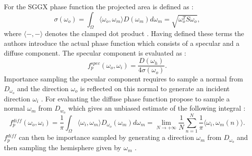 For the SGGX phase function the projected area is defined as \cite[p. 4]{sggx}:
\begin{equation}
    \label{eq:projected_area}
    \sigma(\omega_o)=\int_\Omega \langle \omega_o, \omega_m \rangle D(\omega_m) d\omega_m = \sqrt{\omega_o^T S \omega_o},
\end{equation}
where $\langle -,-\rangle$ denotes the clamped dot product \cite[p. 3]{sggx}.
Having defined these terms the authors introduce the actual phase function which consists of a specular and a diffuse component.
The specular component is evaluated as \cite[p.7]{sggx}:
\begin{equation}
    f{}^{spec}_p(\omega_o, \omega_i) = \frac{D(\omega_h)}{4 \sigma(\omega_o)}.
\end{equation}
Importance sampling the specular component requires to sample a normal from $D_{\omega_o}$ and the direction $\omega_o$ is reflected on this normal to generate an incident direction $\omega_i$ \cite[p. 8]{sggx}.
For evaluating the diffuse phase function \citeauthor{sggx} propose to sample a normal $\omega_m$ from $D_{w_o}$ which gives an unbiased estimate of the following integral \cite[p. 8]{sggx}:
\begin{equation}
    f{}^{diff}_p(\omega_o, \omega_i) = \frac{1}{\pi}\int_\Omega \langle\omega_i,\omega_m\rangle D_{\omega_o}(\omega_m) d\omega_m = \lim \limits_{N \to +\infty} \frac{1}{N} \sum_{n=1}^N \frac{1}{\pi} \langle\omega_i,\omega_m(n)\rangle.
\end{equation}
$f{}^{diff}_p$ can then be importance sampled by generating a direction $\omega_m$ from $D_{\omega_o}$ and then sampling the hemisphere given by $\omega_m$ \cite[p. 8]{sggx}.

